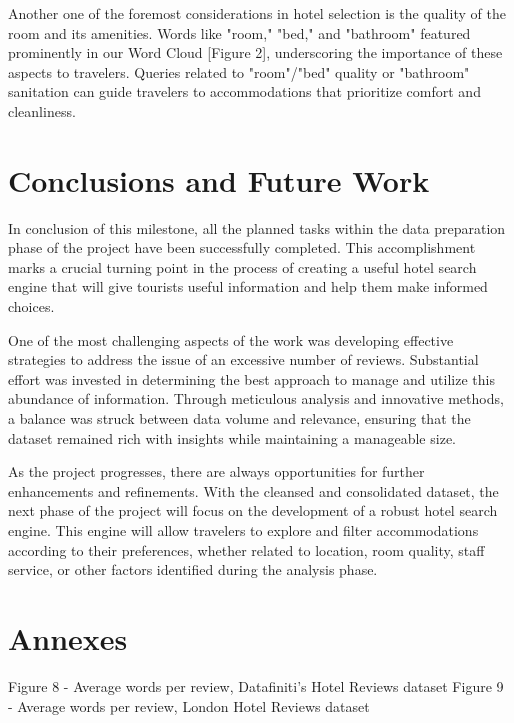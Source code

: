 \documentclass[sigconf]{acmart}
\begin{document}
Another one of the foremost considerations in hotel selection is the quality of the room and its amenities. Words like "room," "bed," and "bathroom" featured prominently in our Word Cloud [Figure 2], underscoring the importance of these aspects to travelers. Queries related to "room"/"bed" quality or "bathroom" sanitation can guide travelers to accommodations that prioritize comfort and cleanliness.


\section{Conclusions and Future Work}

In conclusion of this milestone, all the planned tasks within the data preparation phase of the project have been successfully completed. This accomplishment marks a crucial turning point in the process of creating a useful hotel search engine that will give tourists useful information and help them make informed choices.

One of the most challenging aspects of the work was developing effective strategies to address the issue of an excessive number of reviews. Substantial effort was invested in determining the best approach to manage and utilize this abundance of information. Through meticulous analysis and innovative methods, a balance was struck between data volume and relevance, ensuring that the dataset remained rich with insights while maintaining a manageable size.

As the project progresses, there are always opportunities for further enhancements and refinements. With the cleansed and consolidated dataset, the next phase of the project will focus on the development of a robust hotel search engine. This engine will allow travelers to explore and filter accommodations according to their preferences, whether related to location, room quality, staff service, or other factors identified during the analysis phase.

\appendix

\section{Annexes}

Figure 8 - Average words per review, Datafiniti's Hotel Reviews dataset
Figure 9 - Average words per review, London Hotel Reviews dataset
\end{document}
